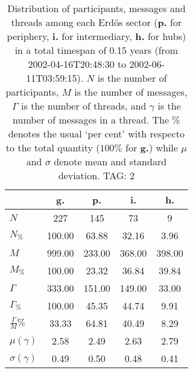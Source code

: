 \begin{table}[h!]
\begin{center}
\begin{tabular}{| l || c | c | c | c |}\hline
 & {\bf g.} & {\bf p.} & {\bf i.} & {\bf h.} \\\hline\hline
$N$ & 227  & 145  & 73  & 9 \\
$N_{\%}$ & 100.00  & 63.88  & 32.16  & 3.96 \\\hline
$M$ & 999.00  & 233.00  & 368.00  & 398.00 \\
$M_{\%}$ & 100.00  & 23.32  & 36.84  & 39.84 \\\hline
$\Gamma$ & 333.00  & 151.00  & 149.00  & 33.00 \\
$\Gamma_{\%}$ & 100.00  & 45.35  & 44.74  & 9.91 \\\hline
$\frac{\Gamma}{M}\%$ & 33.33  & 64.81  & 40.49  & 8.29 \\
$\mu(\gamma)$ & 2.58  & 2.49  & 2.63  & 2.79 \\
$\sigma(\gamma)$ & 0.49  & 0.50  & 0.48  & 0.41 \\\hline
\end{tabular}
\caption{Distribution of participants, messages and threads among each Erd\"os sector ({\bf p.} for periphery, {\bf i.} for intermediary, 
    {\bf h.} for hubs) in a total timespan of 0.15 years (from 2002-04-16T20:48:30 to 2002-06-11T03:59:15). $N$ is the number of participants, $M$ is the number of messages, $\Gamma$ is the number of threads, and $\gamma$ is the number of messages in a thread.
    The \% denotes the usual `per cent' with respecto to the total quantity ($100\%$ for {\bf g.})
    while $\mu$ and $\sigma$ denote mean and standard deviation. TAG: 2}
\end{center}
\end{table}